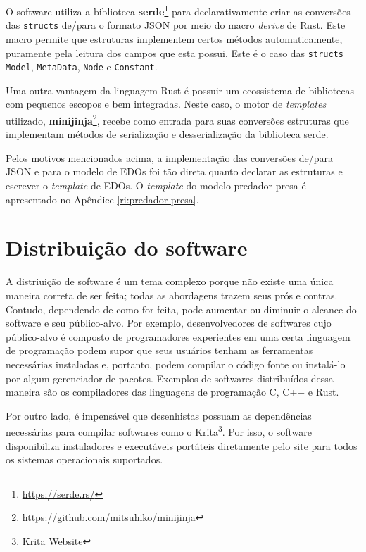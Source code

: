 \documentclass[
	12pt,				%
	openright,			%
	oneside,			%
	a4paper,			%
	main=brazil,
	english,			%
	]{ufsj-abntex2}
\begin{document}
O software utiliza a biblioteca \textbf{serde}\footnote{\href{https://serde.rs/}{https://serde.rs/}} para declarativamente criar as conversões das \texttt{structs} de/para o formato JSON por meio do macro \textit{derive} de Rust. Este macro permite que estruturas implementem certos métodos automaticamente, puramente pela leitura dos campos que esta possui. Este é o caso das \texttt{structs} \texttt{Model}, \texttt{MetaData}, \texttt{Node} e \texttt{Constant}.

Uma outra vantagem da linguagem Rust é possuir um ecossistema de bibliotecas com pequenos escopos e bem integradas. Neste caso, o motor de \textit{templates} utilizado, \textbf{minijinja}\footnote{\href{https://github.com/mitsuhiko/minijinja}{https://github.com/mitsuhiko/minijinja}}, recebe como entrada para suas conversões estruturas que implementam métodos de serialização e desserialização da biblioteca serde.

Pelos motivos mencionados acima, a implementação das conversões de/para JSON e para o modelo de EDOs foi tão direta quanto declarar as estruturas e escrever o \textit{template} de EDOs. O \textit{template} do modelo predador-presa é apresentado no Apêndice \ref{ri:predador-presa}.

\section{Distribuição do software}
\label{sec:distribuicao}

A distriuição de software é um tema complexo porque não existe uma única maneira correta de ser feita; todas as abordagens trazem seus prós e contras. Contudo, dependendo de como for feita, pode aumentar ou diminuir o alcance do software e seu público-alvo. Por exemplo, desenvolvedores de softwares cujo público-alvo é composto de programadores experientes em uma certa linguagem de programação podem supor que seus usuários tenham as ferramentas necessárias instaladas e, portanto, podem compilar o código fonte ou instalá-lo por algum gerenciador de pacotes. Exemplos de softwares distribuídos dessa maneira são os compiladores das linguagens de programação C, C++ e Rust.

Por outro lado, é impensável que desenhistas possuam as dependências necessárias para compilar softwares como o Krita\footnote{\href{https://krita.org/en/}{Krita Website}}. Por isso, o software disponibiliza instaladores e executáveis portáteis diretamente pelo site para todos os sistemas operacionais suportados.
\end{document}
